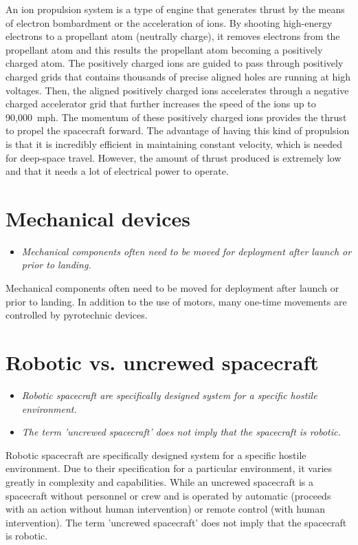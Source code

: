 An ion propulsion system is a type of engine that generates thrust by
the means of electron bombardment or the acceleration of ions. By
shooting high-energy electrons to a propellant atom (neutrally charge),
it removes electrons from the propellant atom and this results the
propellant atom becoming a positively charged atom. The positively
charged ions are guided to pass through positively charged grids that
contains thousands of precise aligned holes are running at high
voltages. Then, the aligned positively charged ions accelerates through
a negative charged accelerator grid that further increases the speed of
the ions up to 90,000~mph. The momentum of these positively charged ions
provides the thrust to propel the spacecraft forward. The advantage of
having this kind of propulsion is that it is incredibly efficient in
maintaining constant velocity, which is needed for deep-space travel.
However, the amount of thrust produced is extremely low and that it
needs a lot of electrical power to operate.

\section{Mechanical devices}\label{mechanical-devices}

\begin{itemize}
\item
  \emph{Mechanical components often need to be moved for deployment
  after launch or prior to landing.}
\end{itemize}

Mechanical components often need to be moved for deployment after launch
or prior to landing. In addition to the use of motors, many one-time
movements are controlled by pyrotechnic devices.

\section{Robotic vs. uncrewed
spacecraft}\label{robotic-vs.-uncrewed-spacecraft}

\begin{itemize}
\item
  \emph{Robotic spacecraft are specifically designed system for a
  specific hostile environment.}
\item
  \emph{The term 'uncrewed spacecraft' does not imply that the
  spacecraft is robotic.}
\end{itemize}

Robotic spacecraft are specifically designed system for a specific
hostile environment. Due to their specification for a particular
environment, it varies greatly in complexity and capabilities. While an
uncrewed spacecraft is a spacecraft without personnel or crew and is
operated by automatic (proceeds with an action without human
intervention) or remote control (with human intervention). The term
'uncrewed spacecraft' does not imply that the spacecraft is robotic.

